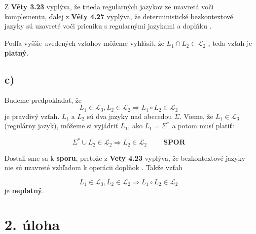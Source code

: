\documentclass[11pt,a4paper]{article}
\begin{document}
Z \textbf{Věty 3.23} vyplýva, že trieda regularných jazykov ze uzavretá voči komplementu, ďalej z \textbf{Věty 4.27} vyplýva, že deterministické bezkontextové jazyky sú uzavreté voči prieniku s regularnými jazykami a doplňku \cite{AA}.


Podľa vyššie uvedených vzťahov môžeme vyhlásiť, že $\overline{\overline{L_1} \cap L_2} \in \mathcal{L}_2$ , teda vzťah je \textbf{platný}.










\subsection{c)}

Budeme predpokladať, že
\begin{equation}
L_1 \in \mathcal{L}_3, L_2 \in \mathcal{L}_2 \Rightarrow L_1 \circ L_2 \in \mathcal{L}_2
\end{equation}
je pravdivý vzťah. $L_1$ a $L_2$ sú dva jazyky nad abecedou $\Sigma$. Vieme, že $L_1 \in \mathcal{L}_3$(regulárny jazyk), môžeme si vyjádriť $L_1$, ako $L_1 = \Sigma^*$ a potom musí platiť:

\begin{equation}
\Sigma^* \cup \overline{L_2} \in \mathcal{L}_2 \Rightarrow \overline{L_2} \in \mathcal{L}_2 \hspace{1cm}\textbf{SPOR}
\end{equation}

Dostali sme sa k \textbf{sporu}, pretože z \textbf{Vety 4.23} vyplýva, že bezkontextové jazyky nie sú uzavreté vzhľadom k operácii doplňok \cite{AA}. Takže vzťah

\begin{equation}
L_1 \in \mathcal{L}_3, L_2 \in \mathcal{L}_2 \Rightarrow L_1 \circ L_2 \in \mathcal{L}_2
\end{equation}
je \textbf{neplatný}.

\newpage
\section{2. úloha}
\end{document}
